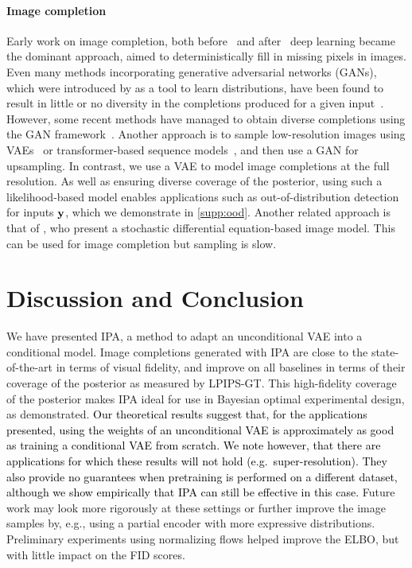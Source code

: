 \paragraph{Image completion}
Early work on image completion, both
before~\citep{bertalmio2000image,bertalmio2001navier,ballester2001filling,levin2003learning,criminisi2003object}
and after~\citep{kohler2014mask,ren2015shepard} deep learning became the
dominant approach, aimed to deterministically fill in missing pixels in images.
Even many methods incorporating generative adversarial networks (GANs), which
were introduced by \citet{goodfellow2014generative} as a tool to learn
distributions, have been found to result in little or no diversity in the
completions produced for a given
input~\citep{song2018spg,yu2018generative,yu2019free,pathak2016context,iizuka2017globally}.
%
However, some recent methods have managed to obtain diverse completions using
the GAN framework~\citep{zhao2020uctgan,zhao2021large,liu2021pd}.
%
Another approach is to sample low-resolution images using
VAEs~\citep{zheng2019pluralistic,peng2021generating} or transformer-based
sequence models~\citep{zheng2021tfill,wan2021high}, and then use a GAN for
upsampling. In contrast, we use a VAE to model image completions at the full
resolution. As well as ensuring diverse coverage of the posterior, using such a
likelihood-based model enables applications such as out-of-distribution
detection for inputs $\mathbf{y}{}$, which we demonstrate in \cref{supp:ood}.
Another related approach is that of \citet{song2020score}, who present a
stochastic differential equation-based image model. This can be used for image
completion but sampling is slow.

\section{Discussion and Conclusion}

We have presented IPA, a method to adapt an unconditional VAE into a conditional
model. Image completions generated with IPA are close to the state-of-the-art in
terms of visual fidelity, and improve on all baselines in terms of their
coverage of the posterior as measured by LPIPS-GT. This high-fidelity coverage
of the posterior makes IPA ideal for use in Bayesian optimal experimental
design, as demonstrated.
%
% 
\textcolor{black}{ Our theoretical results suggest that, for the applications
  presented, using the weights of an unconditional VAE is approximately as good
  as training a conditional VAE from scratch. We note however, that there are
  applications for which these results will not hold (e.g.~super-resolution).
  They also provide no guarantees when pretraining is performed on a different
  dataset, although we show empirically that IPA can still be effective in this
  case. }
% 
Future work may look more rigorously at these settings or further improve the
image samples by, e.g., using a partial encoder with more expressive
distributions.
%
Preliminary experiments using normalizing flows helped improve the ELBO, but
with little impact on the FID scores.